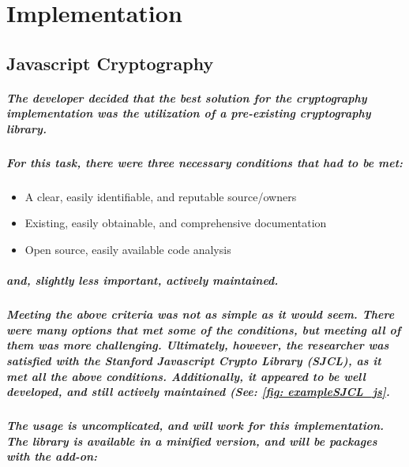 \chapter{Implementation}

\section{Javascript Cryptography}

\paragraph{The developer decided that the best solution for the cryptography implementation was the utilization of a pre-existing cryptography library.}

\paragraph{For this task, there were three necessary conditions that had to be met:}

\begin{itemize}
\item A clear, easily identifiable, and reputable source/owners
\item Existing, easily obtainable, and comprehensive documentation
\item Open source, easily available code analysis
\end{itemize}

\paragraph{and, slightly less important, actively maintained.}

\paragraph{Meeting the above criteria was not as simple as it would seem. There were many options that met some of the conditions, but meeting all of them was more challenging. Ultimately, however, the researcher was satisfied with the Stanford Javascript Crypto Library (SJCL), as it met all the above conditions. Additionally, it appeared to be well developed, and still actively maintained (See: \ref{fig: exampleSJCL_js}.}\cite[Website]{SJCL}

\paragraph{The usage is uncomplicated, and will work for this implementation. The library is available in a minified version, and will be packages with the add-on:}

